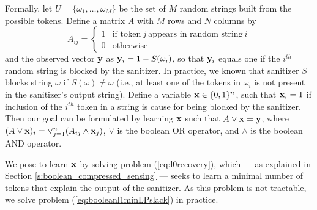 Formally, let $U=\{\omega_1,\ldots,\omega_M\}$ be the set of $M$ random strings built from the possible tokens.  Define a matrix $A$ with $M$ rows and $N$ columns by 
\[A_{ij}=
\begin{cases} 1 &\mbox{if token}\ j\ \mbox{appears in random string}\ i \\
0 & \mbox{otherwise}
\end{cases} 
\]
and the observed vector $\mathbf{y}$ as $\mathbf{y}_i=1-S(\omega_i)$, so that $\mathbf{y}_i$ equals one if the $i^{th}$ random string is blocked by the sanitizer.  In practice, we known that sanitizer $S$ blocks string $\omega$ if $S(\omega)\neq\omega$ (i.e., at least one of the tokens in $\omega_i$ is not present in the sanitizer's output string).  Define a variable $\mathbf{x}\in\{0,1\}^n$, such that $\mathbf{x}_i=1$ if inclusion of the $i^{th}$ token in a string is cause for being blocked by the sanitizer.  Then our goal can be formulated by learning $\mathbf{x}$ such that $A\vee \mathbf{x}=\mathbf{y}$, where $(A\vee \mathbf{x})_i=\vee_{j=1}^n(A_{ij}\wedge \mathbf{x}_j)$, $\vee$ is the boolean OR operator, and $\wedge$ is the boolean AND operator.  

We pose to learn $\mathbf{x}$ by solving problem (\ref{eq:l0recovery}), which --- as explained in Section \ref{s:boolean_compressed_sensing} --- seeks to learn a minimal number of tokens that explain the output of the sanitizer. As this problem is not tractable, we solve problem (\ref{eq:booleanl1minLPslack}) in practice. 

